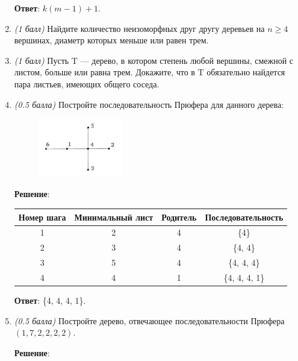 \documentclass{article}
\begin{document}
\begin{enumerate}
    \textbf{Ответ}: $k(m-1)+1$.

    \item \textit{(1 балл)} Найдите количество неизоморфных друг другу деревьев на $n \geq 4$ вершинах, диаметр которых меньше или равен трем.
    \item \textit{(1 балл)} Пусть T — дерево, в котором степень любой вершины, смежной с листом, больше или равна трем. Докажите, что в T обязательно найдется пара листьев, имеющих общего соседа.
    \item \textit{(0.5 балла)} Постройте последовательность Прюфера для данного дерева:
    
    \begin{figure}[h]
        \centering
        \includegraphics[width=0.35\textwidth]{images/12.5.png}
    \end{figure}

    \textbf{Решение}:
    
    \begin{table}[h]
        \centering
        \begin{tabular}{|c|c|c|c|}
            \hline
            Номер шага & Минимальный лист & Родитель & Последовательность \\
            \hline
            1 & 2 & 4 & \{4\} \\
            \hline
            2 & 3 & 4 & \{4, 4\} \\
            \hline
            3 & 5 & 4 & \{4, 4, 4\} \\
            \hline
            4 & 4 & 1 & \{4, 4, 4, 1\} \\
            \hline
        \end{tabular}
    \end{table}
    
    \textbf{Ответ}: \{4, 4, 4, 1\}.

    \item \textit{(0.5 балла)} Постройте дерево, отвечающее последовательности Прюфера $(1, 7, 2, 2, 2, 2)$.
    
    \textbf{Решение}:
    

\end{enumerate}
\end{document}
